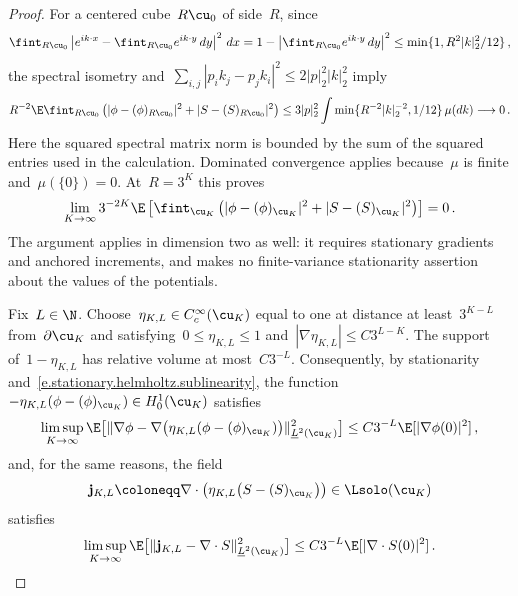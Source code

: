 \documentclass[11pt]{amsart}
\begin{document}
\begin{proof}
\smallskip

For a centered cube~$R\cu_0$ of side~$R$, since
\begin{equation*}
	\fint_{R\cu_0}\left|e^{ik\cdot x}-\fint_{R\cu_0}e^{ik\cdot y}\,dy\right|^2\,dx
	=1-\left|\fint_{R\cu_0}e^{ik\cdot y}\,dy\right|^2
	\leq\min\{1,R^2|k|_2^2/12\}\,,
\end{equation*}
the spectral isometry and~$\sum_{i,j}|p_i k_j-p_j k_i|^2\leq2|p|_2^2|k|_2^2$ imply
\begin{equation*}
	R^{-2}\E\fint_{R\cu_0}\left(|\phi-(\phi)_{R\cu_0}|^2+|S-(S)_{R\cu_0}|^2\right)
	\leq3|p|_2^2\int\min\{R^{-2}|k|_2^{-2},1/12\}\,\mu(dk)
	\longrightarrow0\,.
\end{equation*}
Here the squared spectral matrix norm is bounded by the sum of the squared entries used in the calculation. Dominated convergence applies because~$\mu$ is finite and~$\mu(\{0\})=0$. At~$R=3^K$ this proves
\begin{equation}
	\lim_{K\to\infty}3^{-2K}\E\left[
	\fint_{\cu_K}\left(
	|\phi-(\phi)_{\cu_K}|^2+|S-(S)_{\cu_K}|^2
	\right)\right]=0\,.
	\label{e.stationary.helmholtz.sublinearity}
\end{equation}
The argument applies in dimension two as well: it requires stationary gradients and anchored increments, and makes no finite-variance stationarity assertion about the values of the potentials.

\smallskip

Fix~$L\in\N$.  Choose~$\eta_{K,L}\in C_c^\infty(\cu_K)$ equal to one at distance at least~$3^{K-L}$ from~$\partial\cu_K$ and satisfying~$0\leq\eta_{K,L}\leq1$ and~$|\nabla\eta_{K,L}|\leq C3^{L-K}$.  The support of~$1-\eta_{K,L}$ has relative volume at most~$C3^{-L}$.  Consequently, by stationarity and~\eqref{e.stationary.helmholtz.sublinearity}, the function~$-\eta_{K,L}(\phi-(\phi)_{\cu_K})\in H_0^1(\cu_K)$ satisfies
\begin{equation*}
	\limsup_{K\to\infty}
	\E\bigl[\|\nabla\phi-\nabla\bigl(\eta_{K,L}(\phi-(\phi)_{\cu_K})\bigr)\|_{
	\underline L^2(\cu_K)}^2\bigr]
	\leq C3^{-L}\E[|\nabla\phi(0)|^2]\,,
\end{equation*}
and, for the same reasons, the field
\begin{equation*}
	\mathbf j_{K,L}\coloneqq
	\nabla\cdot\left(
	\eta_{K,L}\bigl(S-(S)_{\cu_K}\bigr)
	\right)
	\in\Lsolo(\cu_K)
\end{equation*}
satisfies
\begin{equation}
	\limsup_{K\to\infty}
	\E\bigl[\|\mathbf j_{K,L}-\nabla\cdot S\|_{
	\underline L^2(\cu_K)}^2\bigr]
	\leq C3^{-L}\E[|\nabla\cdot S(0)|^2]\,.
	\label{e.stationary.solenoidal.approximation}
\end{equation}


\end{proof}
\end{document}
